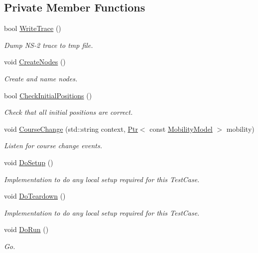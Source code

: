 \subsection*{Private Member Functions}
\begin{DoxyCompactItemize}
\item 
bool \hyperlink{classNs2MobilityHelperTest_a47c41a5bc87d3bca10ce9ea70fdc8806}{Write\+Trace} ()
\begin{DoxyCompactList}\small\item\em Dump N\+S-\/2 trace to tmp file. \end{DoxyCompactList}\item 
void \hyperlink{classNs2MobilityHelperTest_a7246bcc36ef8d9e61e45fabaae5ae47a}{Create\+Nodes} ()
\begin{DoxyCompactList}\small\item\em Create and name nodes. \end{DoxyCompactList}\item 
bool \hyperlink{classNs2MobilityHelperTest_a243a7724198f1922c9a9510650a9262f}{Check\+Initial\+Positions} ()
\begin{DoxyCompactList}\small\item\em Check that all initial positions are correct. \end{DoxyCompactList}\item 
void \hyperlink{classNs2MobilityHelperTest_a39ff55c6aff8f6afae543a4d439fbe1b}{Course\+Change} (std\+::string context, \hyperlink{classns3_1_1Ptr}{Ptr}$<$ const \hyperlink{classns3_1_1MobilityModel}{Mobility\+Model} $>$ mobility)
\begin{DoxyCompactList}\small\item\em Listen for course change events. \end{DoxyCompactList}\item 
void \hyperlink{classNs2MobilityHelperTest_a9b5e012631ac56c227643e6990269b7e}{Do\+Setup} ()
\begin{DoxyCompactList}\small\item\em Implementation to do any local setup required for this Test\+Case. \end{DoxyCompactList}\item 
void \hyperlink{classNs2MobilityHelperTest_a28be948759976bf88e6241fab01b794b}{Do\+Teardown} ()
\begin{DoxyCompactList}\small\item\em Implementation to do any local setup required for this Test\+Case. \end{DoxyCompactList}\item 
void \hyperlink{classNs2MobilityHelperTest_aa79cdb96d0a0882645114e6a088e8d60}{Do\+Run} ()
\begin{DoxyCompactList}\small\item\em Go. \end{DoxyCompactList}\end{DoxyCompactItemize}
